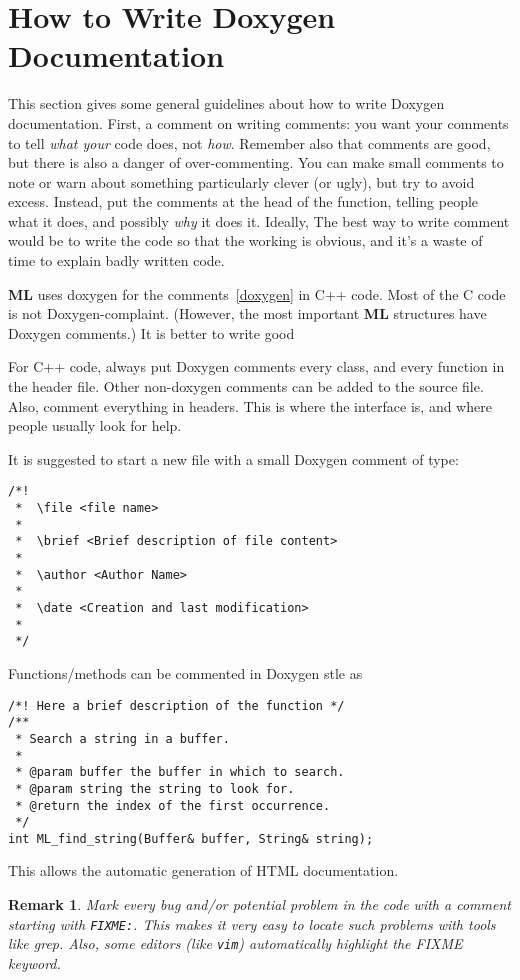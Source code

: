 \documentclass[10pt,letter,relax]{SANDreport}
\newtheorem{remark}{Remark}
\newcommand{\ML}     {{\bf ML }}
\begin{document}

\section{How to Write Doxygen Documentation}
\label{sec:doxygen}

This section gives some general guidelines about how to write Doxygen
documentation.  First, a comment on writing comments: you want your comments
to tell {\sl what your} code does, not {\sl how}.  Remember also that comments
are good, but there is also a danger of over-commenting. You can make small
comments to note or warn about something particularly clever (or ugly), but
try to avoid excess.  Instead, put the comments at the head of the function,
telling people what it does, and possibly {\sl why} it does it.  Ideally,
The best way to write comment would be to write the code so that the working
is obvious, and it's a waste of time to explain badly written code.

\ML uses doxygen for the comments~\ref{doxygen} in C++ code. Most
  of the C code is not Doxygen-complaint. (However, the most important
  \ML structures have Doxygen comments.) It is better to write good

For C++ code, always put Doxygen comments every class, and every
  function in the header file.  Other non-doxygen comments can be added
  to the source file.
Also, comment everything in headers. This is where the
  interface is, and where people usually look for help.

It is suggested to start a new file with a small Doxygen comment of type:
\begin{verbatim}
/*!
 *  \file <file name>
 *
 *  \brief <Brief description of file content>
 *
 *  \author <Author Name>
 *
 *  \date <Creation and last modification>
 *
 */
\end{verbatim}

Functions/methods can be commented in Doxygen stle as
\begin{verbatim}
/*! Here a brief description of the function */
/**
 * Search a string in a buffer.
 *
 * @param buffer the buffer in which to search.
 * @param string the string to look for.
 * @return the index of the first occurrence.
 */
int ML_find_string(Buffer& buffer, String& string);
\end{verbatim}
This allows the automatic generation of HTML documentation. 

\begin{remark} 
  Mark every bug and/or potential problem in the code with a comment
  starting with \verb!FIXME:!. This makes it very easy to locate such
  problems with tools like grep. Also, some editors (like \verb!vim!)
  automatically highlight the FIXME keyword.
\end{remark}
\end{document}
